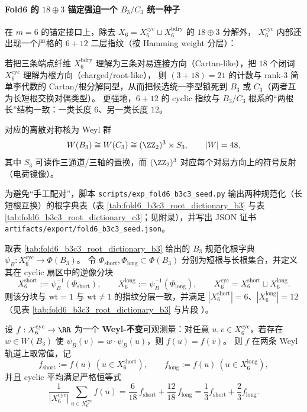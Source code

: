 \paragraph{Fold6 的 \texorpdfstring{$18\oplus 3$}{18+3} 锚定强迫一个 \texorpdfstring{$B_3/C_3$}{B3/C3} 统一种子}
在 \(m=6\) 的锚定接口上，除去 \(X_6=X_6^{\mathrm{cyc}}\sqcup X_6^{\mathrm{bdry}}\) 的 \(18\oplus 3\) 分解外，
\(X_6^{\mathrm{cyc}}\) 内部还出现一个严格的 \(6+12\) 二层指纹（按 Hamming weight 分层）：

若把三条端点纤维 \(X_6^{\mathrm{bdry}}\) 理解为三条对易连接方向（Cartan-like），把 \(18\) 个闭词 \(X_6^{\mathrm{cyc}}\) 理解为根方向（charged/root-like），
则 \((3+18)=21\) 的计数与 rank-\(3\) 简单李代数的 Cartan/根分解同型，从而把候选统一李型锁死到 \(B_3\) 或 \(C_3\)（两者互为长短根交换对偶类型）。
更强地，\(6+12\) 的 cyclic 指纹与 \(B_3/C_3\) 根系的“两根长”结构一致：一类长度 \(6\)、另一类长度 \(12\)。
\par
对应的离散对称核为 Weyl 群
\[
W(B_3)\cong W(C_3)\cong (\ZZ_2)^3\rtimes S_3,\qquad |W|=48,
\]
其中 \(S_3\) 可读作三通道/三轴的置换，而 \((\ZZ_2)^3\) 对应每个对易方向上的符号反射（电荷镜像）。
\par
为避免“手工配对”，脚本 \texttt{scripts/exp\_fold6\_b3c3\_seed.py} 输出两种规范化（长短根互换）的根字典表（表 \ref{tab:fold6_b3c3_root_dictionary_b3} 与表 \ref{tab:fold6_b3c3_root_dictionary_c3}；见附录），并写出 JSON 证书 \texttt{artifacts/export/fold6\_b3c3\_seed.json}。

\begin{corollary}\label{cor:fold6-weyl-two-orbit-compression}
取表 \ref{tab:fold6_b3c3_root_dictionary_b3} 给出的 \(B_3\) 规范化根字典
\(\psi_B:X_6^{\mathrm{cyc}}\to \Phi(B_3)\)。
令 \(\Phi_{\mathrm{short}},\Phi_{\mathrm{long}}\subset\Phi(B_3)\) 分别为短根与长根集合，并定义其在 cyclic 扇区中的逆像分块
\[
X_6^{\mathrm{short}}:=\psi_B^{-1}(\Phi_{\mathrm{short}}),\qquad
X_6^{\mathrm{long}}:=\psi_B^{-1}(\Phi_{\mathrm{long}}),
\qquad
X_6^{\mathrm{cyc}}=X_6^{\mathrm{short}}\sqcup X_6^{\mathrm{long}}.
\]
则该分块与 \(\mathrm{wt}=1\) 与 \(\mathrm{wt}\neq 1\) 的指纹分层一致，并满足
\(|X_6^{\mathrm{short}}|=6\)、\(|X_6^{\mathrm{long}}|=12\)（见表 \ref{tab:fold6_b3c3_root_dictionary_b3} 与片段 \texttt{}）。
\par
设 \(f:X_6^{\mathrm{cyc}}\to\RR\) 为一个 \textbf{Weyl-不变}可观测量：对任意 \(u,v\in X_6^{\mathrm{cyc}}\)，若存在 \(w\in W(B_3)\) 使
\(\psi_B(v)=w\cdot \psi_B(u)\)，则 \(f(u)=f(v)\)。
则 \(f\) 在两条 Weyl 轨道上取常值，记
\[
f_{\mathrm{short}}:=f(u)\ (u\in X_6^{\mathrm{short}}),\qquad
f_{\mathrm{long}}:=f(u)\ (u\in X_6^{\mathrm{long}}),
\]
并且 cyclic 平均满足严格恒等式
\[
\frac{1}{|X_6^{\mathrm{cyc}}|}\sum_{u\in X_6^{\mathrm{cyc}}} f(u)
=
\frac{6}{18}\,f_{\mathrm{short}}+\frac{12}{18}\,f_{\mathrm{long}}
=
\frac13 f_{\mathrm{short}}+\frac23 f_{\mathrm{long}}.
\]
\end{corollary}

